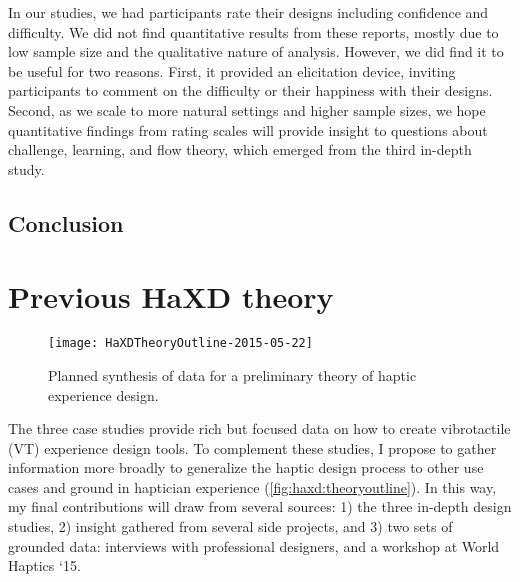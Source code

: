 In our studies, we had participants rate their designs including confidence and difficulty.
We did not find quantitative results from these reports, mostly due to low sample size and the qualitative nature of analysis.
However, we did find it to be useful for two reasons.
First, it provided an elicitation device, inviting participants to comment on the difficulty or their happiness with their designs.
Second, as we scale to more natural settings and higher sample sizes, we hope quantitative findings from rating scales will provide insight to questions about challenge, learning, and flow theory, which emerged from the third in-depth study.






%
%
\subsection{Conclusion}





\section{Previous HaXD theory}


\begin{figure}[h] %
   \centering
   \texttt{[image: HaXDTheoryOutline-2015-05-22]} 
   \caption{Planned synthesis of data for a preliminary theory of haptic experience design.}
   \label{fig:haxd:theoryoutline}
\end{figure}


The three case studies provide rich but focused data on how to create vibrotactile (VT) experience design tools.
To complement these studies, I propose to gather information more broadly to generalize the haptic design process to other use cases and ground in haptician experience (\autoref{fig:haxd:theoryoutline}).
In this way, my final contributions will draw from several sources: 
1) the three in-depth design studies,
2) insight gathered from several side projects, and
3) two sets of grounded data: interviews with professional designers, and
a workshop at World Haptics `15.

